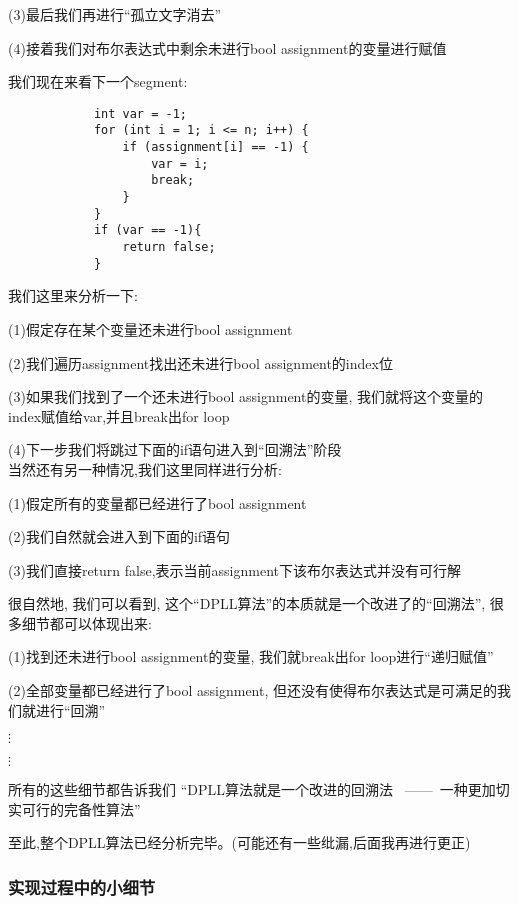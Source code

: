             \par
            (3)最后我们再进行``孤立文字消去''
            \par
            (4)接着我们对布尔表达式中剩余未进行bool assignment的变量进行赋值
            \par
            我们现在来看下一个segment:
            \begin{lstlisting}
            int var = -1;
            for (int i = 1; i <= n; i++) {
                if (assignment[i] == -1) {
                    var = i;
                    break;
                }
            }
            if (var == -1){
                return false;
            }  
            \end{lstlisting}
            \noindent
            我们这里来分析一下:
            \par
            (1)假定存在某个变量还未进行bool assignment
            \par
            (2)我们遍历assignment找出还未进行bool assignment的index位
            \par
            (3)如果我们找到了一个还未进行bool assignment的变量,
            我们就将这个变量的index赋值给var,并且break出for loop
            \par
            (4)下一步我们将跳过下面的if语句进入到``回溯法''阶段
            \\
            当然还有另一种情况,我们这里同样进行分析:
            \par
            (1)假定所有的变量都已经进行了bool assignment
            \par
            (2)我们自然就会进入到下面的if语句
            \par
            (3)我们直接return false,表示当前assignment下该布尔表达式并没有可行解
            \par
            很自然地,
            我们可以看到,
            这个``DPLL算法''的本质就是一个改进了的``回溯法'',
            很多细节都可以体现出来:
            \par
            (1)找到还未进行bool assignment的变量,
            我们就break出for loop进行``递归赋值''
            \par
            (2)全部变量都已经进行了bool assignment,
            但还没有使得布尔表达式是可满足的我们就进行``回溯''
            \begin{center}
                $\vdots$
            \end{center}
            \begin{center}
                $\vdots$
            \end{center}
            \par
            所有的这些细节都告诉我们
            ``DPLL算法就是一个改进的回溯法
            \ ——\ 一种更加切实可行的完备性算法'' 
            \par
            至此,整个DPLL算法已经分析完毕。(可能还有一些纰漏,后面我再进行更正)             
        \subsubsection{实现过程中的小细节}
